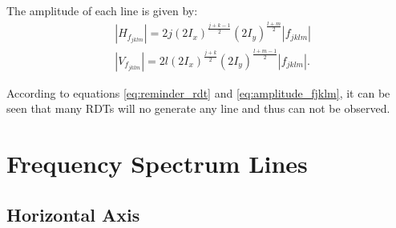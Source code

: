 The amplitude of each line is given by:
\begin{equation}
    \begin{aligned}
    &|H_{f_{jklm}}| = 2 j (2 I_x)^\frac{j+k-1}{2} (2 I_y)^\frac{l+m}{2} |f_{jklm}| \\
    &|V_{f_{jklm}}| = 2 l (2 I_x)^\frac{j+k}{2} (2 I_y)^\frac{l+m-1}{2} |f_{jklm}|.
    \label{eq:amplitude_fjklm}
    \end{aligned}
\end{equation}

According to equations \ref{eq:reminder_rdt} and \ref{eq:amplitude_fjklm}, it can be seen that many RDTs will no generate any line and thus can not be observed.

\section{Frequency Spectrum Lines}

\subsection{Horizontal Axis}

